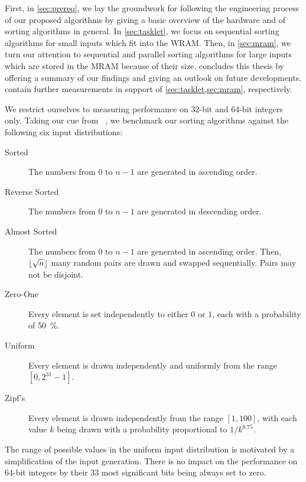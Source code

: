 First, in \cref{sec:prereq}, we lay the groundwork for following the engineering process of our proposed algorithms by giving a basic overview of the \upmem{} hardware and of sorting algorithms in general.
In \cref{sec:tasklet}, we focus on sequential sorting algorithms for small inputs which fit into the \acs*{WRAM}.
Then, in \cref{sec:mram}, we turn our attention to sequential and parallel sorting algorithms for large inputs which are stored in the \acs*{MRAM} because of their size.
 concludes this thesis by offering a summary of our findings and giving an outlook on future developments.
 contain further measurements in support of \cref{sec:tasklet,sec:mram}, respectively.

We restrict ourselves to measuring performance on 32-bit and 64-bit integers only.
Taking our cue from \citeauthor{axtmann2020engineering}~\cite{axtmann2020engineering}, we benchmark our sorting algorithms against the following six input distributions:
\begin{description}
	\item[Sorted]
	The numbers from \(0\) to \(n - 1\) are generated in ascending order.

	\item[Reverse Sorted]
	The numbers from \(0\) to \(n - 1\) are generated in descending order.

	\item[Almost Sorted]
	The numbers from \(0\) to \(n - 1\) are generated in ascending order.
	Then, \(\lfloor\sqrt{n}\rfloor\) many random pairs are drawn and swapped sequentially.
	Pairs may not be disjoint.

	\item[Zero-One]
	Every element is set independently to either \(0\) or \(1\), each with a probability of \qty{50}{\percent}.

	\item[Uniform]
	Every element is drawn independently and uniformly from the range \([0, 2^{31} - 1]\).

	\item[Zipf's]
	Every element is drawn independently from the range \([1, 100]\), with each value \(k\) being drawn with a probability proportional to \(1/k^{0.75}\).
\end{description}
The range of possible values in the uniform input distribution is motivated by a simplification of the input generation.
There is no impact on the performance on 64-bit integers by their 33 most significant bits being always set to zero.
